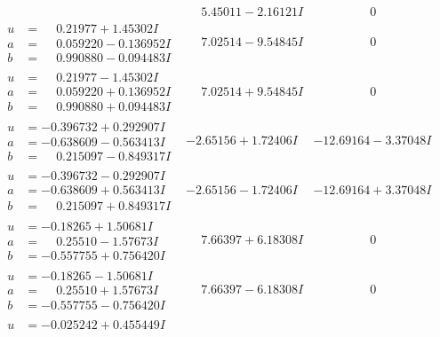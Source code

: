 \documentclass[1p]{elsarticle_modified}
\theoremstyle{definition}
\begin{document}
$$\begin{array}{c|c|c}
 & \phantom{-}5.45011 - 2.16121 I & \phantom{-0.000000 } 0 \\ \hline\begin{aligned}
u &= \phantom{-}0.21977 + 1.45302 I \\
a &= \phantom{-}0.059220 - 0.136952 I \\
b &= \phantom{-}0.990880 - 0.094483 I\end{aligned}
 & \phantom{-}7.02514 - 9.54845 I & \phantom{-0.000000 } 0 \\ \hline\begin{aligned}
u &= \phantom{-}0.21977 - 1.45302 I \\
a &= \phantom{-}0.059220 + 0.136952 I \\
b &= \phantom{-}0.990880 + 0.094483 I\end{aligned}
 & \phantom{-}7.02514 + 9.54845 I & \phantom{-0.000000 } 0 \\ \hline\begin{aligned}
u &= -0.396732 + 0.292907 I \\
a &= -0.638609 - 0.563413 I \\
b &= \phantom{-}0.215097 - 0.849317 I\end{aligned}
 & -2.65156 + 1.72406 I & -12.69164 - 3.37048 I \\ \hline\begin{aligned}
u &= -0.396732 - 0.292907 I \\
a &= -0.638609 + 0.563413 I \\
b &= \phantom{-}0.215097 + 0.849317 I\end{aligned}
 & -2.65156 - 1.72406 I & -12.69164 + 3.37048 I \\ \hline\begin{aligned}
u &= -0.18265 + 1.50681 I \\
a &= \phantom{-}0.25510 - 1.57673 I \\
b &= -0.557755 + 0.756420 I\end{aligned}
 & \phantom{-}7.66397 + 6.18308 I & \phantom{-0.000000 } 0 \\ \hline\begin{aligned}
u &= -0.18265 - 1.50681 I \\
a &= \phantom{-}0.25510 + 1.57673 I \\
b &= -0.557755 - 0.756420 I\end{aligned}
 & \phantom{-}7.66397 - 6.18308 I & \phantom{-0.000000 } 0 \\ \hline\begin{aligned}
u &= -0.025242 + 0.455449 I \\

\end{aligned}
\end{array}$$
\end{document}
